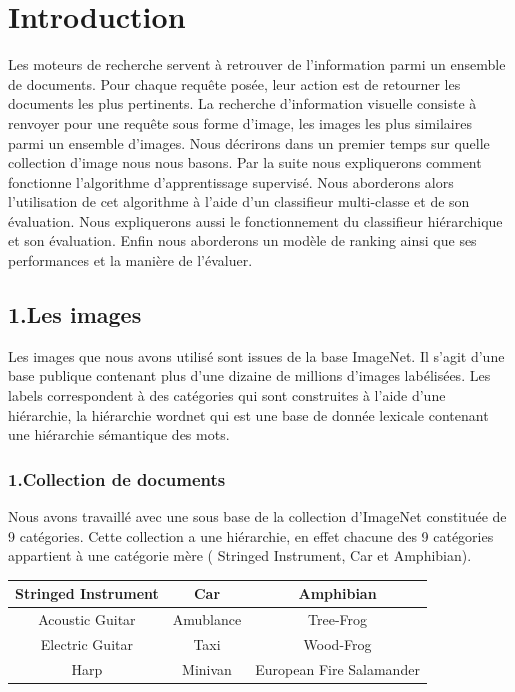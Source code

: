 \documentclass[a4paper,11pt]{report}
\begin{document}
\newpage
\tableofcontents







\chapter*{{\centering Introduction}}
Les moteurs de recherche servent à retrouver de l'information parmi un ensemble de documents. Pour chaque requête posée, leur action est de retourner les documents les plus pertinents. La recherche d'information visuelle consiste à renvoyer pour une requête sous forme d'image, les images les plus similaires parmi un ensemble d'images. Nous décrirons dans un premier temps sur quelle collection d'image nous nous basons. Par la suite nous expliquerons comment fonctionne l'algorithme d'apprentissage supervisé. Nous aborderons alors l'utilisation de cet algorithme à l'aide d'un classifieur multi-classe et de son évaluation. Nous expliquerons aussi le fonctionnement du classifieur hiérarchique et son évaluation. Enfin nous aborderons un modèle de ranking ainsi que ses performances et la manière de l'évaluer.
\section*{1.Les images}
Les images que nous avons utilisé sont issues de la base ImageNet. Il s'agit d'une base publique contenant plus d'une dizaine de millions d'images labélisées. Les labels correspondent à des catégories qui sont construites à l'aide d'une hiérarchie, la hiérarchie wordnet qui est une base de donnée lexicale contenant une hiérarchie sémantique des mots.

\subsection*{1.Collection de documents}
Nous avons travaillé avec une sous base de la collection d'ImageNet constituée de 9 catégories. Cette collection a une hiérarchie, en effet chacune des 9 catégories appartient à une catégorie mère ( Stringed Instrument, Car et Amphibian).\\
\begin{center}
\begin{tabular}{|c|c|c|}
\hline
Stringed Instrument & Car & Amphibian\\
\hline
\hline
Acoustic Guitar & Amublance & Tree-Frog\\
Electric Guitar& Taxi & Wood-Frog\\
Harp& Minivan & European Fire Salamander\\
\hline
\end{tabular}
\end{center}
\end{document}
